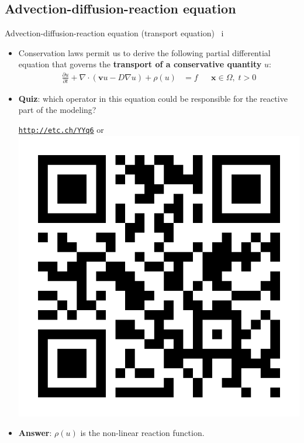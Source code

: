 \subsection{Advection-diffusion-reaction equation}
\begin{frame}{Advection-diffusion-reaction equation (transport equation) \, i}
\begin{itemize}
\item Conservation laws permit us to derive the following partial differential
equation that governs the {\bf transport of a conservative quantity} $u$:
%
{
	\small
	\begin{align*}
		\frac{\partial u}{\partial t}+\nabla\cdot(\boldsymbol{v}u-D\nabla u) + \rho (u) & =f &  & \boldsymbol{x}\in\Omega,\;t>0
	\end{align*}
}
%
	\item \alert{\bf Quiz}: which operator in this equation could be responsible for the reactive part of the modeling?
	\begin{center}
		\href{http://etc.ch/YYq6}{\textcolor{indigo(dye)}{\tt http://etc.ch/YYq6}} \quad or \quad 
		\includegraphics[height=0.2\columnwidth]{figures/reactive-transport/polls.png}
	\end{center}
	\item \alert{\bf Answer}: $\rho (u)$ is the non-linear reaction function. 
%

\end{itemize}
\end{frame}
